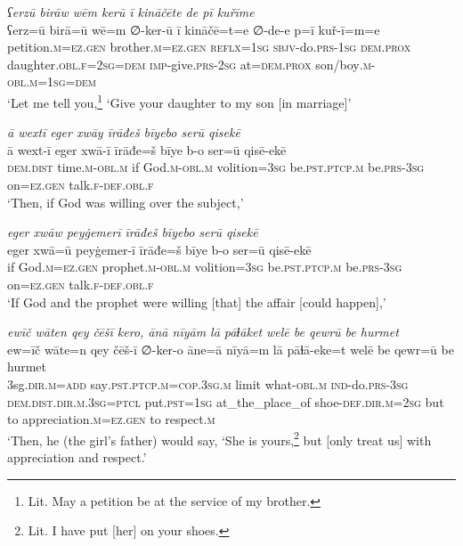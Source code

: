 \ea \label{RE.7}
\textit{ʕerzū birāw wēm kerū ī kināčēte de pī kuřīme} \\ 
\gll ʕerz=ū birā=ū wē=m ∅-ker-ū ī kināčē=t=e ∅-de-e p=ī kuř-ī=m=e \\ 
 petition\textsc{.m}\textsc{\textsc{=ez.gen}} brother\textsc{.m}\textsc{\textsc{=ez.gen}} \textsc{reflx}\textsc{=\textsc{1sg}} \textsc{sbjv-}do\textsc{.prs}\textsc{-\textsc{1sg}} \textsc{dem.prox} daughter\textsc{.obl}\textsc{.f}\textsc{=\textsc{2sg}}\textsc{=dem} \textsc{imp-}give\textsc{.prs}-\textsc{2sg} at=\textsc{dem.prox} son/boy\textsc{.m}\textsc{-obl}\textsc{.m}\textsc{=\textsc{1sg}}\textsc{=dem} \\ 
\glt `Let me tell you,\footnote{Lit. May a petition be at the service of my brother.} ‘Give your daughter to my son [in marriage]'
\z 
 
\ea \label{RE.8}
\textit{ā wextī eger xwāy īrāđeš bīyebo serū qisekē} \\ 
\gll ā wext-ī eger xwā-ī īrāđe=š bīye b-o ser=ū qisē-ekē \\ 
 \textsc{dem.dist} time\textsc{.m}\textsc{-obl}\textsc{.m} if God\textsc{.m}\textsc{-obl}\textsc{.m} volition\textsc{=3sg} be\textsc{.pst}\textsc{.ptcp}\textsc{.m} be\textsc{.prs}\textsc{-3sg} on\textsc{\textsc{=ez.gen}} talk\textsc{.f}\textsc{-def}\textsc{.obl}\textsc{.f} \\ 
\glt `Then, if God was willing over the subject,'
\z 
 
\ea \label{RE.9}
\textit{eger xwāw peyġemerī īrāđeš bīyebo serū qisekē} \\ 
\gll eger xwā=ū peyġemer-ī īrāđe=š bīye b-o ser=ū qisē-ekē \\ 
 if God\textsc{.m}\textsc{\textsc{=ez.gen}} prophet\textsc{.m}\textsc{-obl}\textsc{.m} volition\textsc{=3sg} be\textsc{.pst}\textsc{.ptcp}\textsc{.m} be\textsc{.prs}\textsc{-3sg} on\textsc{\textsc{=ez.gen}} talk\textsc{.f}\textsc{-def}\textsc{.obl}\textsc{.f} \\ 
\glt `If God and the prophet were willing [that] the affair [could happen],'
\z 
 
\ea \label{RE.10}
\textit{ewīč wāten qey čēšī kero, ānā nīyām lā pāɫāket welē be qewrū be hurmet} \\ 
\gll ew=īč wāte=n qey čēš-ī ∅-ker-o āne=ā nīyā=m lā pāɫā-eke=t welē be qewr=ū be hurmet \\ 
 3sg\textsc{.dir}\textsc{.m}\textsc{=add} say\textsc{.pst}\textsc{.ptcp}\textsc{.m}\textsc{=cop}\textsc{.3sg}\textsc{.m} limit what\textsc{-obl}\textsc{.m} \textsc{ind-}do\textsc{.prs}\textsc{-3sg} \textsc{dem.dist}\textsc{.dir}\textsc{.m}\textsc{.3sg}=\textsc{ptcl} put\textsc{.pst}\textsc{=\textsc{1sg}} at\_the\_place\_of shoe\textsc{-def}\textsc{.dir}\textsc{.m}\textsc{=\textsc{2sg}} but to appreciation\textsc{.m}\textsc{\textsc{=ez.gen}} to respect\textsc{.m} \\ 
\glt `Then, he (the girl’s father) would say, ‘She is yours,\footnote{Lit. I have put [her] on your shoes.} but [only treat us] with appreciation and respect.'
\z 
 
